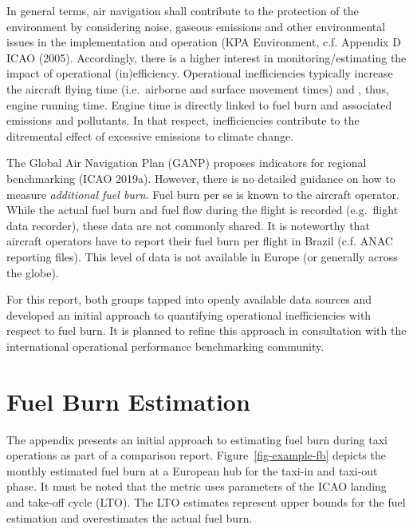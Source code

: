 \documentclass[
  a4paper,
  DIV=11,
  numbers=noendperiod]{scrreprt}
\begin{document}
In general terms, air navigation shall contribute to the protection of
the environment by considering noise, gaseous emissions and other
environmental issues in the implementation and operation (KPA
Environment, c.f. Appendix D ICAO (2005). Accordingly, there is a higher
interest in monitoring/estimating the impact of operational
(in)efficiency. Operational inefficiencies typically increase the
aircraft flying time (i.e.~airborne and surface movement times) and ,
thus, engine running time. Engine time is directly linked to fuel burn
and associated emissions and pollutants. In that respect, inefficiencies
contribute to the ditremental effect of excessive emissions to climate
change.

The Global Air Navigation Plan (GANP) proposes indicators for regional
benchmarking (ICAO 2019a). However, there is no detailed guidance on how
to measure \emph{additional fuel burn}. Fuel burn per se is known to the
aircraft operator. While the actual fuel burn and fuel flow during the
flight is recorded (e.g.~flight data recorder), these data are not
commonly shared. It is noteworthy that aircraft operators have to report
their fuel burn per flight in Brazil (c.f. ANAC reporting files). This
level of data is not available in Europe (or generally across the
globe).

For this report, both groups tapped into openly available data sources
and developed an initial approach to quantifying operational
inefficiencies with respect to fuel burn. It is planned to refine this
approach in consultation with the international operational performance
benchmarking community.

\hypertarget{fuel-burn-estimation}{%
\section{Fuel Burn Estimation}\label{fuel-burn-estimation}}

The appendix presents an initial approach to estimating fuel burn during
taxi operations as part of a comparison report.
Figure~\ref{fig-example-fb} depicts the monthly estimated fuel burn at a
European hub for the taxi-in and taxi-out phase. It must be noted that
the metric uses parameters of the ICAO landing and take-off cycle (LTO).
The LTO estimates represent upper bounds for the fuel estimation and
overestimates the actual fuel burn.
\end{document}
